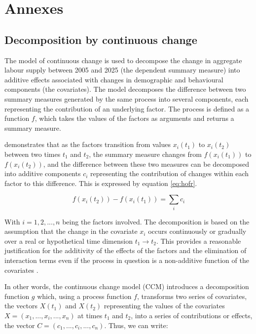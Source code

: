 \section{Annexes}

\subsection{Decomposition by continuous change}

The model of continuous change \citep{horiuchiDecompositionMethodBased2008} is used to decompose the change in aggregate labour supply between 2005 and 2025 (the dependent summary measure) into additive effects associated with changes in demographic and behavioural components (the covariates). The model decomposes the difference between two summary measures generated by the same process into several components, each representing the contribution of an underlying factor. The process is defined as a function \(f\), which takes the values of the factors as arguments and returns a summary measure.

\vspace{0.7em}\par
\citet{horiuchiDecompositionMethodBased2008} demonstrates that as the factors transition from values \(x_i(t_1)\) to \(x_i(t_2)\) between two times \(t_1\) and \(t_2\), the summary measure changes from \(f(x_i(t_1))\) to \(f(x_i(t_2))\), and the difference between these two measures can be decomposed into additive components \(c_{i}\) representing the contribution of changes within each factor to this difference. This is expressed by equation \eqref{eq:hofr}.

\begin{equation} \label{eq:hofr}
    f(x_i(t_2)) - f(x_i(t_1)) = \displaystyle\sum_{i}c_{i}
\end{equation}

\vspace{0.7em}\par
With \(i = 1, 2, ..., n\) being the factors involved. The decomposition is based on the assumption that the change in the covariate \(x_i\) occurs continuously or gradually over a real or hypothetical time dimension \(t_1 \rightarrow t_2\). This provides a reasonable justification for the additivity of the effects of the factors and the elimination of interaction terms even if the process in question is a non-additive function of the covariates \citep[p.~786]{horiuchiDecompositionMethodBased2008}.

\vspace{0.7em}\par
In other words, the continuous change model (CCM) introduces a decomposition function \(g\) which, using a process function \(f\), transforms two series of covariates, the vectors \(X(t_1)\) and \(X(t_2)\) representing the values of the covariates \(X = (x_1, ..., x_i, ..., x_n)\) at times \(t_1\) and \(t_2\), into a series of contributions or effects, the vector \(C = (c_1, ..., c_i, ..., c_n)\). Thus, we can write:

